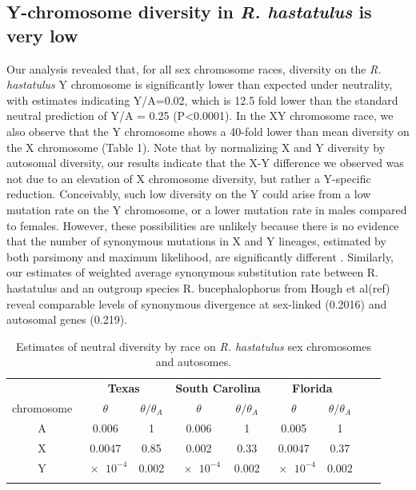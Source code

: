 \documentclass[9pt,twocolumn,twoside]{gsajnl}
\begin{document}
\subsection*{Y-chromosome diversity in \textit{R. hastatulus} is very low}
Our analysis revealed that, for all sex chromosome races, diversity on the \textit{R. hastatulus} Y chromosome is significantly lower than expected under neutrality, with estimates indicating Y/A=0.02, which is 12.5 fold lower than the standard neutral prediction of Y/A = 0.25 (P<0.0001). In the XY chromosome race, we also observe that the Y chromosome shows a 40-fold lower than mean diversity on the X chromosome (Table 1). Note that by normalizing X and Y diversity by autosomal diversity, our results indicate that the X-Y difference we observed was not due to an elevation of X chromosome diversity, but rather a Y-specific reduction. Conceivably, such low diversity on the Y could arise from a low mutation rate on the Y chromosome, or a lower mutation rate in males compared to females. However, these possibilities are unlikely because there is no evidence that the number of synonymous mutations in X and Y lineages, estimated by both parsimony and maximum likelihood, are significantly different \citep{hough2014}. Similarly, our estimates of weighted average synonymous substitution rate between R. hastatulus and an outgroup species R. bucephalophorus from Hough et al(ref) reveal comparable levels of synonymous divergence at sex-linked (0.2016) and autosomal genes (0.219).

\begin{table}[t!]
\centering
\caption{Estimates of neutral diversity by race on \textit{R. hastatulus} sex chromosomes and autosomes.}
\begin{tabular}{ccccccccc}
\textbf{} & \multicolumn{2}{c}{\textbf{Texas}} & \multicolumn{2}{c}{\textbf{South Carolina}} & \multicolumn{2}{c}{\textbf{Florida}} \\
chromosome & $\theta$ & $\theta/\theta_{A}$ & $\theta$ & $\theta/\theta_{A}$ & $\theta$ & $\theta/\theta_{A}$ \\
\midrule
A & 0.006 & 1 & 0.006 & 1 & 0.005 & 1 \\
X & 0.0047 & 0.85 & 0.002 & 0.33 & 0.0047 & 0.37 \\
Y & $\num{e-4}$ & 0.002 & $\num{e-4}$ & 0.002 & $\num{e-4}$ & 0.002 \\
\addlinespace

\bottomrule
\end{tabular}
\end{table}
\end{document}
